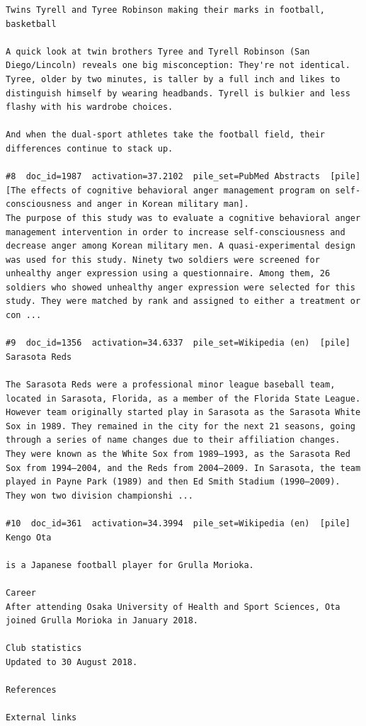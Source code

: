 \begin{verbatim}
Twins Tyrell and Tyree Robinson making their marks in football, basketball

A quick look at twin brothers Tyree and Tyrell Robinson (San Diego/Lincoln) reveals one big misconception: They're not identical. Tyree, older by two minutes, is taller by a full inch and likes to distinguish himself by wearing headbands. Tyrell is bulkier and less flashy with his wardrobe choices.

And when the dual-sport athletes take the football field, their differences continue to stack up.

#8  doc_id=1987  activation=37.2102  pile_set=PubMed Abstracts  [pile]
[The effects of cognitive behavioral anger management program on self-consciousness and anger in Korean military man].
The purpose of this study was to evaluate a cognitive behavioral anger management intervention in order to increase self-consciousness and decrease anger among Korean military men. A quasi-experimental design was used for this study. Ninety two soldiers were screened for unhealthy anger expression using a questionnaire. Among them, 26 soldiers who showed unhealthy anger expression were selected for this study. They were matched by rank and assigned to either a treatment or con ...

#9  doc_id=1356  activation=34.6337  pile_set=Wikipedia (en)  [pile]
Sarasota Reds

The Sarasota Reds were a professional minor league baseball team, located in Sarasota, Florida, as a member of the Florida State League. However team originally started play in Sarasota as the Sarasota White Sox in 1989. They remained in the city for the next 21 seasons, going through a series of name changes due to their affiliation changes. They were known as the White Sox from 1989–1993, as the Sarasota Red Sox from 1994–2004, and the Reds from 2004–2009. In Sarasota, the team played in Payne Park (1989) and then Ed Smith Stadium (1990–2009). They won two division championshi ...

#10  doc_id=361  activation=34.3994  pile_set=Wikipedia (en)  [pile]
Kengo Ota

is a Japanese football player for Grulla Morioka.

Career
After attending Osaka University of Health and Sport Sciences, Ota joined Grulla Morioka in January 2018.

Club statistics
Updated to 30 August 2018.

References

External links


\end{verbatim}
